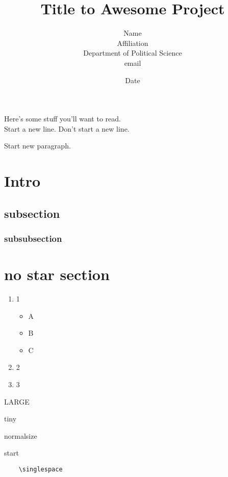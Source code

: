 \documentclass[12pt]{article}
\title{Title to Awesome Project} %
\author{Name \\ Affiliation \\  Department of Political Science \\email}
\date{Date}%
\begin{document}
\maketitle

Here's some stuff you'll want to read.\\

Start a new line.
Don't start a new line. 

Start new paragraph.

\section{Intro}
\subsection{subsection}
\subsubsection{subsubsection}


\section*{no star section}


\begin{enumerate}
  \item 1
  \begin{itemize}
    \item A
    \item B
    \item C
  \end{itemize}
  \item 2
  \item 3
\end{enumerate}


{\LARGE LARGE}

\tiny tiny

\normalsize normalsize

\doublespace

\singlespace


\indent \indent start


\begin{verbatim}
    \singlespace
\end{verbatim}
\end{document}
